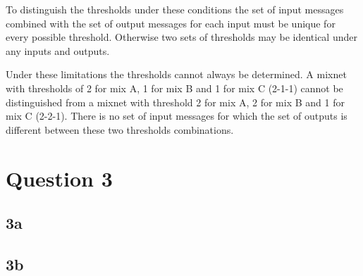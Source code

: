 \documentclass{article}
\begin{document}
To distinguish the thresholds under these conditions the set of input messages combined with the set of output messages for each input must be unique for every possible threshold. Otherwise two sets of thresholds may be identical under any inputs and outputs.

Under these limitations the thresholds cannot always be determined. A mixnet with thresholds of 2 for mix A, 1 for mix B and 1 for mix C (2-1-1) cannot be distinguished from a mixnet with threshold 2 for mix A, 2 for mix B and 1 for mix C (2-2-1). There is no set of input messages for which the set of outputs is different between these two thresholds combinations.

\section{Question 3}
\subsection{3a}
\subsection{3b}
\end{document}
